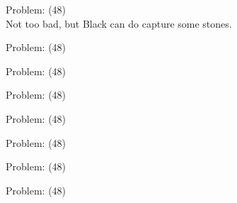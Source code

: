 \documentclass[11pt]{article}
\begin{document}
\begin{minipage}[t]{0.5\textwidth}
  {\centering
  
  Problem: (48)\\
  Not too bad, but Black can do capture some stones.\\
  }
\end{minipage}
\begin{minipage}[t]{0.5\textwidth}
  {\centering
  
  Problem: (48)\\
  
  }
\end{minipage}
\begin{minipage}[t]{0.5\textwidth}
  {\centering
  
  Problem: (48)\\
  
  }
\end{minipage}
\begin{minipage}[t]{0.5\textwidth}
  {\centering
  
  Problem: (48)\\
  
  }
\end{minipage}
\begin{minipage}[t]{0.5\textwidth}
  {\centering
  
  Problem: (48)\\
  
  }
\end{minipage}
\begin{minipage}[t]{0.5\textwidth}
  {\centering
  
  Problem: (48)\\
  
  }
\end{minipage}
\begin{minipage}[t]{0.5\textwidth}
  {\centering
  
  Problem: (48)\\
  
  }
\end{minipage}
\begin{minipage}[t]{0.5\textwidth}
  {\centering
  
  Problem: (48)\\
  
  }
\end{minipage}
\end{document}

